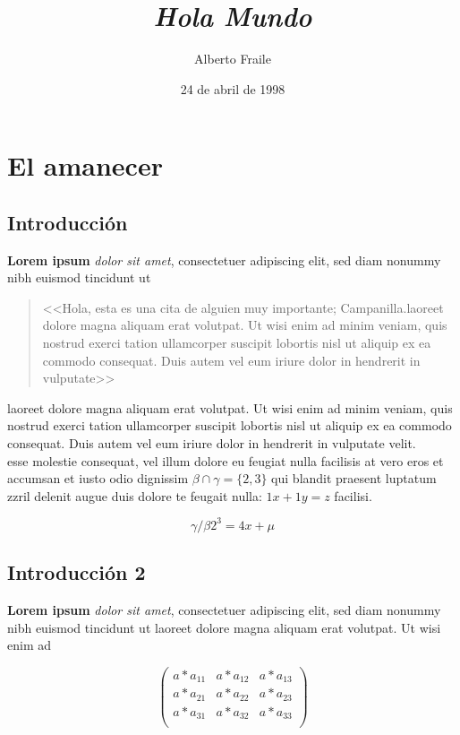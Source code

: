\documentclass[a4paper, 11pt, titlepage, twocolumn]{book}
\title{\textit{Hola Mundo}}
\author{Alberto Fraile}
\date{24 de abril de 1998}
\begin{document}
\maketitle
\tableofcontents
\newpage

\chapter{El amanecer}
\section{Introducción}

\textbf{Lorem ipsum} \textit{dolor sit amet}, consectetuer 
adipiscing elit, sed diam nonummy nibh euismod tincidunt ut 

\begin{quote}
    \small <<Hola, esta es una cita de alguien muy importante; Campanilla.laoreet dolore magna aliquam erat volutpat. Ut wisi enim ad 
    minim veniam, quis nostrud exerci tation ullamcorper suscipit 
    lobortis nisl ut aliquip ex ea commodo consequat. Duis autem 
    vel eum iriure dolor in hendrerit in vulputate>>
\end{quote}

laoreet dolore magna aliquam erat volutpat. Ut wisi enim ad 
minim veniam, quis nostrud exerci tation ullamcorper suscipit 
lobortis nisl ut aliquip ex ea commodo consequat. Duis autem 
vel eum iriure dolor in hendrerit in vulputate velit. \\ esse molestie 
consequat, vel illum dolore eu feugiat nulla facilisis at vero eros 
et accumsan et iusto odio dignissim $\beta \cap \gamma = \{2,3\}$ qui blandit praesent luptatum 
zzril delenit augue duis dolore te feugait nulla: $1x + 1y = z$ facilisi.

\[ \gamma / \beta 2^3 = 4x + \mu \]

\section{Introducción 2} \label{introduction2}

\textbf{Lorem ipsum} \textit{dolor sit amet}, consectetuer 
adipiscing elit, sed diam nonummy nibh euismod tincidunt ut 
laoreet dolore magna aliquam erat volutpat. Ut wisi enim ad 

\[
    \begin{pmatrix}
        a*a_{11} & a*a_{12} & a*a_{13} \\ 
        a*a_{21} & a*a_{22} & a*a_{23} \\
        a*a_{31} & a*a_{32} & a*a_{33} \\
    \end{pmatrix}  
\]
\end{document}

